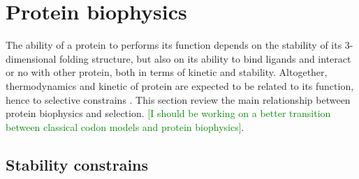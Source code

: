 %


\section{Protein biophysics}

The ability of a protein to performs its function depends on the stability of its 3-dimensional folding structure, but also on its ability to bind ligands and interact or no with other protein, both in terms of kinetic and stability.
Altogether, thermodynamics and kinetic of protein are expected to be related to its function, hence to selective constrains \citep{Bastolla2017}.
This section review the main relationship between protein biophysics and selection.
\textcolor{GREEN}{[I should be working on a better transition between classical codon models and protein biophysics]}.
\subsection{Stability constrains}

